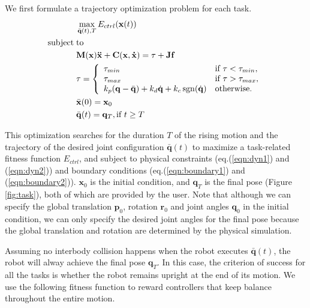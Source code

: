 We first formulate a trajectory optimization problem for each task.
\begin{align}
 \label{eqn:obj}&\max_{\bar{\mathbf{q}}(t),T} E_{ctrl}(\mathbf{x}(t))\\
\nonumber  \mathrm{subject\;} &\mathrm{to} \\
\label{eqn:dyn1} & \mathbf{M}(\mathbf{x})\mathbf{\ddot{x}}+\mathbf{C}(\mathbf{x},\mathbf{\dot{x}}) =\tau + \mathbf{Jf}\\
\label{eqn:dyn2} &\tau =
  \left\{
    \begin{array}{ll}
      \tau_{min} & \text{if }\tau < \tau_{min},\\
      \tau_{max} & \text{if }\tau > \tau_{max},\\
      k_p(\mathbf{q}-\bar{\mathbf{q}}) + k_d\dot{\mathbf{q}} + k_c\operatorname{sgn}(\dot{\mathbf{q}}) & \text{otherwise.}\\
    \end{array}
  \right.\\
\label{eqn:boundary1}&\bar{\mathbf{x}}(0) = \mathbf{x}_0\\
\label{eqn:boundary2}&\bar{\mathbf{q}}(t) = \mathbf{q}_T, \text{if } t \geq T
\end{align}

This optimization searches for the duration $T$ of the rising motion and the trajectory of the desired joint configuration $\bar{\mathbf{q}}(t)$ to maximize a task-related fitness function $E_{ctrl}$, and subject to physical constraints (eq.(\ref{eqn:dyn1}) and (\ref{eqn:dyn2})) and boundary conditions (eq.(\ref{eqn:boundary1}) and (\ref{eqn:boundary2})). $\mathbf{x}_0$ is the initial condition, and $\mathbf{q}_T$ is the final pose (Figure \ref{fig:task}), both of which are provided by the user. Note that although we can specify the global translation $\mathbf{p}_0$, rotation $\mathbf{r}_0$ and joint angles $\mathbf{q}_0$ in the initial condition, we can only specify the desired joint angles for the final pose because the global translation and rotation are determined by the physical simulation.

Assuming no interbody collision happens when the robot executes $\bar{\mathbf{q}}(t)$, the robot will alway achieve the final pose $\mathbf{q}_T$. In this case, the criterion of success for all the tasks is whether the robot remains upright at the end of its motion. We use the following fitness function to reward controllers that keep balance throughout the entire motion.

